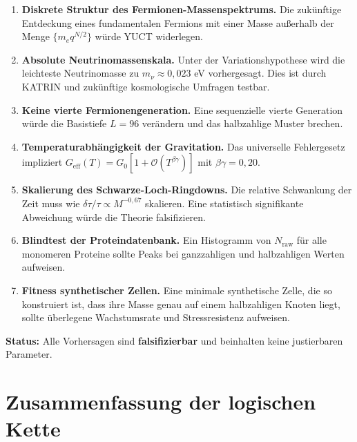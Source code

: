 \documentclass[12pt,a4paper]{article}
\begin{document}
	\begin{enumerate}
		\item \textbf{Diskrete Struktur des Fermionen-Massenspektrums.} Die zukünftige Entdeckung eines fundamentalen Fermions mit einer Masse außerhalb der Menge \(\{m_e q^{N/2}\}\) würde YUCT widerlegen.
		\item \textbf{Absolute Neutrinomassenskala.} Unter der Variationshypothese wird die leichteste Neutrinomasse zu \(m_{\nu} \approx 0,023\) eV vorhergesagt. Dies ist durch KATRIN und zukünftige kosmologische Umfragen testbar.
		\item \textbf{Keine vierte Fermionengeneration.} Eine sequenzielle vierte Generation würde die Basistiefe \(L = 96\) verändern und das halbzahlige Muster brechen.
		\item \textbf{Temperaturabhängigkeit der Gravitation.} Das universelle Fehlergesetz impliziert \(G_{\mathrm{eff}}(T) = G_0[1 + \mathcal{O}(T^{\beta\gamma})]\) mit \(\beta\gamma = 0,20\).
		\item \textbf{Skalierung des Schwarze-Loch-Ringdowns.} Die relative Schwankung der Zeit muss wie \(\delta\tau/\tau \propto M^{-0,67}\) skalieren. Eine statistisch signifikante Abweichung würde die Theorie falsifizieren.
		\item \textbf{Blindtest der Proteindatenbank.} Ein Histogramm von \(N_{\mathrm{raw}}\) für alle monomeren Proteine sollte Peaks bei ganzzahligen und halbzahligen Werten aufweisen.
		\item \textbf{Fitness synthetischer Zellen.} Eine minimale synthetische Zelle, die so konstruiert ist, dass ihre Masse genau auf einem halbzahligen Knoten liegt, sollte überlegene Wachstumsrate und Stressresistenz aufweisen.
	\end{enumerate}
	
	\textbf{Status:} Alle Vorhersagen sind \textbf{falsifizierbar} und beinhalten keine justierbaren Parameter.
	
	\section*{Zusammenfassung der logischen Kette}
	
\end{document}
